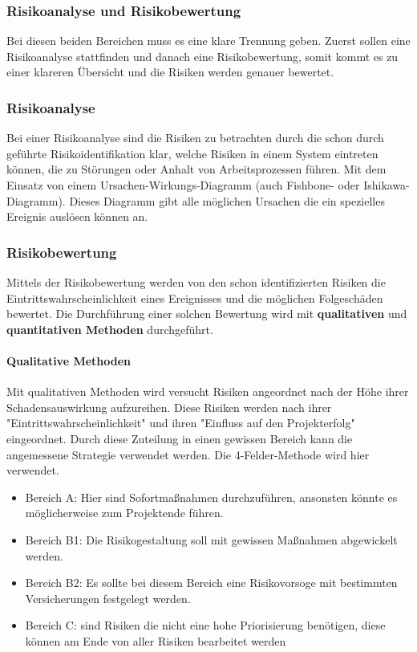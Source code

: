 \subsubsection{Risikoanalyse und Risikobewertung}
Bei diesen beiden Bereichen muss es eine klare Trennung geben. Zuerst sollen eine Risikoanalyse stattfinden und danach eine Risikobewertung, somit kommt es zu einer klareren Übersicht und die Risiken werden genauer bewertet.

\subsubsection{Risikoanalyse}
Bei einer Risikoanalyse sind die Risiken zu betrachten durch die schon durch geführte Risikoidentifikation klar, welche Risiken in einem System eintreten können, die zu Störungen oder Anhalt von Arbeitsprozessen führen. Mit dem Einsatz von einem Ursachen-Wirkungs-Diagramm (auch Fishbone- oder Ishikawa-Diagramm). Dieses Diagramm gibt alle möglichen Ursachen die ein spezielles Ereignis auslösen können an.

\subsubsection{Risikobewertung}
Mittels der Risikobewertung werden von den schon identifizierten Risiken die Eintrittswahrscheinlichkeit eines Ereignisses und die möglichen Folgeschäden bewertet. Die Durchführung einer solchen Bewertung wird mit \textbf{qualitativen} und \textbf{quantitativen Methoden} durchgeführt.

\paragraph{Qualitative Methoden}
Mit qualitativen Methoden wird versucht Risiken angeordnet nach der Höhe ihrer Schadensauswirkung aufzureihen.
Diese Risiken werden nach ihrer "Eintrittswahrscheinlichkeit" und ihren "Einfluss auf den Projekterfolg" eingeordnet. Durch diese Zuteilung in einen gewissen Bereich kann die angemessene Strategie verwendet werden. Die 4-Felder-Methode wird hier verwendet.


\begin{itemize}
	\item Bereich A: Hier sind Sofortmaßnahmen durchzuführen, ansonsten könnte es möglicherweise zum Projektende führen.
	\item Bereich B1: Die Risikogestaltung soll mit gewissen Maßnahmen abgewickelt werden.
	\item Bereich B2: Es sollte bei diesem Bereich eine Risikovorsoge mit bestimmten Versicherungen festgelegt werden.
	\item Bereich C: sind Risiken die nicht eine hohe Priorisierung benötigen, diese können am Ende von aller Risiken bearbeitet werden
\end{itemize}


